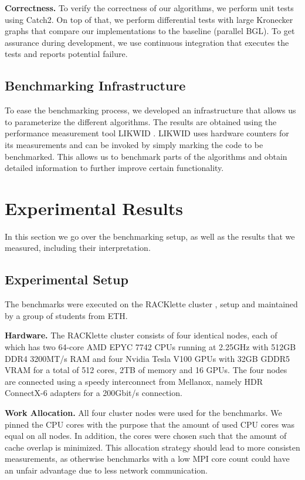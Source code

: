 \documentclass[letterpaper]{article}
\newcommand{\mypar}[1]{{\bf #1.}}
\begin{document}
\mypar{Correctness}
To verify the correctness of our algorithms, we perform unit tests using Catch2. On top of that, we perform differential
tests with large Kronecker graphs that compare our implementations to the baseline (parallel BGL). To get assurance
during development, we use continuous integration that executes the tests and reports potential failure.

\subsection{Benchmarking Infrastructure}
To ease the benchmarking process, we developed an infrastructure that allows us to parameterize the different
algorithms. The results are obtained using the performance measurement tool LIKWID \cite{treibig2010likwid}. LIKWID uses
hardware counters for its measurements and can be invoked by simply marking the code to be benchmarked. This allows us
to benchmark parts of the algorithms and obtain detailed information to further improve certain functionality.

\section{Experimental Results}
\label{sec:exp}
In this section we go over the benchmarking setup, as well as the results that we measured, including their
interpretation.

\subsection{Experimental Setup}
The benchmarks were executed on the RACKlette cluster \cite{racklette}, setup and maintained by a group of students from
ETH.

\mypar{Hardware}
The RACKlette cluster consists of four identical nodes, each of which has two 64-core AMD EPYC 7742 CPUs running at
2.25GHz with 512GB DDR4 3200MT/s RAM and four Nvidia Tesla V100 GPUs with 32GB GDDR5 VRAM for a total of 512 cores, 2TB
of memory and 16 GPUs. The four nodes are connected using a speedy interconnect from Mellanox, namely HDR ConnectX-6
adapters for a 200Gbit/s connection.

\mypar{Work Allocation}
All four cluster nodes were used for the benchmarks. We pinned the CPU cores with the purpose that the amount of used
CPU cores was equal on all nodes. In addition, the cores were chosen such that the amount of cache overlap is minimized.
This allocation strategy should lead to more consisten measurements, as otherwise benchmarks with a low MPI core count
could have an unfair advantage due to less network communication.
\end{document}
